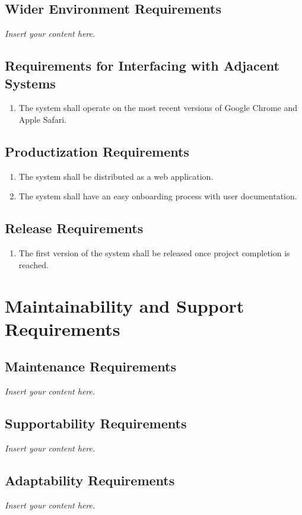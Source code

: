 \documentclass[12pt]{article}
\newcommand{\lips}{\textit{Insert your content here.}}
\begin{document}
\subsection{Wider Environment Requirements}
\lips
\subsection{Requirements for Interfacing with Adjacent Systems}
\begin{enumerate}
  \item The system shall operate on the most recent versions of Google Chrome and Apple Safari.
\end{enumerate}

\subsection{Productization Requirements}
\begin{enumerate}
  \item The system shall be distributed as a web application.
  \item The system shall have an easy onboarding process with user documentation.
\end{enumerate}

\subsection{Release Requirements}
\begin{enumerate}
  \item The first version of the system shall be released once project completion is reached.
\end{enumerate}

\section{Maintainability and Support Requirements}
\subsection{Maintenance Requirements}
\lips
\subsection{Supportability Requirements}
\lips
\subsection{Adaptability Requirements}
\lips
\end{document}
